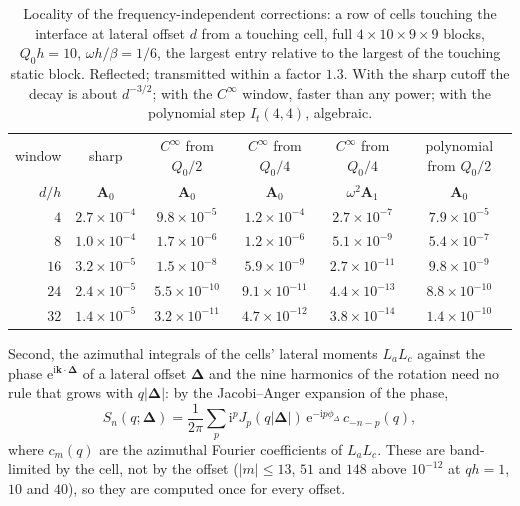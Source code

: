 \documentclass[11pt,a4paper]{article}
\newcommand{\bk}{\mathbf{k}}
\newcommand{\ii}{\mathrm{i}}
\newcommand{\ee}{\mathrm{e}}
\begin{document}
\begin{table}[h]
\centering
\small
\begin{tabular}{rccccc}
\toprule
window & sharp & $C^\infty$ from $Q_0/2$ & $C^\infty$ from $Q_0/4$ & $C^\infty$ from $Q_0/4$ & polynomial from $Q_0/2$ \\
$d/h$ & $\mathbf A_0$ & $\mathbf A_0$ & $\mathbf A_0$ & $\omega^2\mathbf A_1$ & $\mathbf A_0$ \\
\midrule
$4$  & $2.7\times10^{-4}$ & $9.8\times10^{-5}$  & $1.2\times10^{-4}$  & $2.7\times10^{-7}$  & $7.9\times10^{-5}$ \\
$8$  & $1.0\times10^{-4}$ & $1.7\times10^{-6}$  & $1.2\times10^{-6}$  & $5.1\times10^{-9}$  & $5.4\times10^{-7}$ \\
$16$ & $3.2\times10^{-5}$ & $1.5\times10^{-8}$  & $5.9\times10^{-9}$  & $2.7\times10^{-11}$ & $9.8\times10^{-9}$ \\
$24$ & $2.4\times10^{-5}$ & $5.5\times10^{-10}$ & $9.1\times10^{-11}$ & $4.4\times10^{-13}$ & $8.8\times10^{-10}$ \\
$32$ & $1.4\times10^{-5}$ & $3.2\times10^{-11}$ & $4.7\times10^{-12}$ & $3.8\times10^{-14}$ & $1.4\times10^{-10}$ \\
\bottomrule
\end{tabular}
\caption{Locality of the frequency-independent corrections: a row of cells touching the interface at lateral
offset $d$ from a touching cell, full $4\times10\times9\times9$ blocks, $Q_0h=10$, $\omega h/\beta=1/6$, the
largest entry relative to the largest of the touching static block. Reflected; transmitted within a factor
$1.3$. With the sharp cutoff the decay is about $d^{-3/2}$; with the $C^\infty$ window, faster than any power;
with the polynomial step $I_t(4,4)$, algebraic.}
\label{tab:locality}
\end{table}

Second, the azimuthal integrals of the cells'
lateral moments $L_aL_c$ against the phase $\ee^{\ii\bk\cdot\boldsymbol\Delta}$ of a lateral offset
$\boldsymbol\Delta$ and the nine harmonics of the rotation need no rule that grows with $q|\boldsymbol\Delta|$:
by the Jacobi--Anger expansion of the phase,
\begin{equation}\label{eq:jacobianger}
  S_n(q;\boldsymbol\Delta)=\frac{1}{2\pi}\sum_p\ii^pJ_p(q|\boldsymbol\Delta|)\,\ee^{-\ii p\phi_\Delta}\,
  c_{-n-p}(q),
\end{equation}
where $c_m(q)$ are the azimuthal Fourier coefficients of $L_aL_c$. These are band-limited by the cell, not by
the offset ($|m|\le13$, $51$ and $148$ above $10^{-12}$ at $qh=1$, $10$ and $40$), so they are computed once for
every offset.
\end{document}
